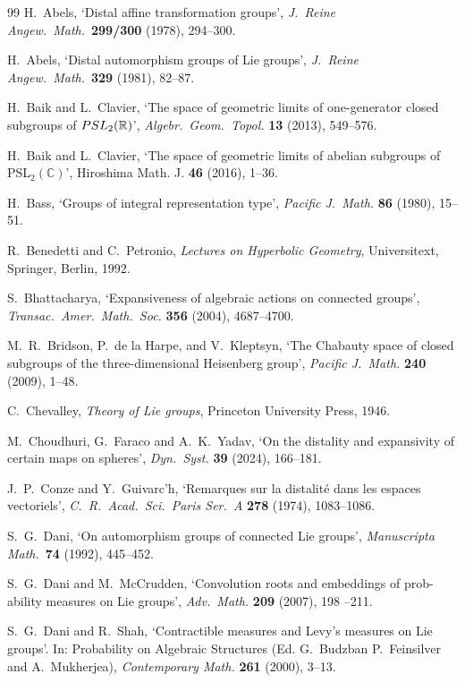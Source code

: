 \documentclass{amsart}
\numberwithin{equation}{section}
\newcommand{\R}{{\mathbb R}}
\newcommand{\C}{{\mathbb C}}
\theoremstyle{remark}
\begin{document}
\begin{thebibliography}{99}
 H.\ Abels, `Distal affine transformation groups', {\em J.\ Reine Angew.\ Math.}\ {\bf 299/300} (1978), 294--300.

 H.\ Abels, `Distal automorphism groups of Lie groups', {\em J.\ Reine Angew.\ Math.}\ {\bf 329} (1981), 82--87.

 H.\ Baik and L.\ Clavier, `The space of geometric limits of one-generator closed subgroups of
${\rm PSL}_2(\R)$', {\em Algebr.\ Geom.\ Topol.} {\bf 13} (2013), 549--576.

 H.\ Baik and L.\ Clavier, `The space of geometric limits of abelian subgroups of PSL$_2(\C)$', 
Hiroshima Math. J. {\bf 46} (2016), 1--36.

 H.\ Bass, `Groups of integral representation type', {\em Pacific J.\ Math.} {\bf 86}
(1980), 15--51.

 R.\ Benedetti and C.\ Petronio, {\em Lectures on Hyperbolic Geometry}, Universitext, Springer, Berlin,
1992.

 S.\ Bhattacharya, `Expansiveness of algebraic actions on connected groups', 
{\em Transac.\ Amer.\ Math.\ Soc.} {\bf 356} (2004), 4687--4700.

 M.\ R.\ Bridson, P.\ de la Harpe, and V.\ Kleptsyn, `The Chabauty space of closed subgroups of
the three-dimensional Heisenberg group', {\em Pacific J.\ Math.} {\bf 240} (2009), 1--48.

 C.\ Chevalley, {\em Theory of Lie groups}, Princeton University Press, 1946.

 M.\ Choudhuri, G.\ Faraco and A.\ K.\ Yadav, `On the distality and expansivity of certain maps on spheres',  
{\em Dyn.\ Syst.} {\bf 39} (2024), 166--181.

 J.\ P.\ Conze and Y.\ Guivarc'h, `Remarques sur la distalit\'e dans les espaces vectoriels',  
{\em C.\ R.\ Acad.\ Sci.\ Paris Ser.\ A} {\bf 278} (1974), 1083--1086.

 S.\ G.\ Dani, `On automorphism groups of connected Lie groups', 
{\em Manuscripta Math.}\ {\bf 74} (1992), 445--452.

 S.\ G.\ Dani and M.\ McCrudden, `Convolution roots and embeddings of prob-
ability measures on Lie groups', {\em Adv.\ Math.} {\bf 209} (2007), 198 --211.

 S.\ G.\ Dani and R.\ Shah, `Contractible measures and Levy's measures on Lie
groups'. In: Probability on Algebraic Structures (Ed. G.\ Budzban P.\ Feinsilver
and A.\ Mukherjea), {\em Contemporary Math.} {\bf 261} (2000), 3--13.


\end{thebibliography}
\end{document}
